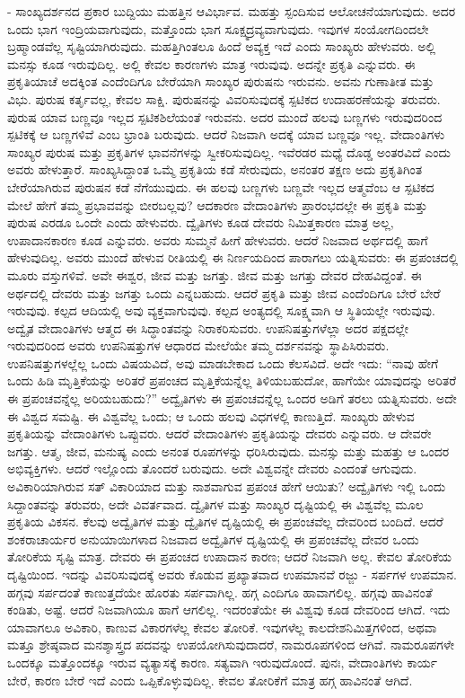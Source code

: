 - ಸಾಂಖ್ಯದರ್ಶನದ ಪ್ರಕಾರ ಬುದ್ದಿಯು ಮಹತ್ತಿನ ಆವಿರ್ಭಾವ. ಮಹತ್ತು ಸ್ಪಂದಿಸುವ ಆಲೋಚನೆಯಾಗುವುದು. ಅದರ ಒಂದು ಭಾಗ ಇಂದ್ರಿಯವಾಗುವುದು, ಮತ್ತೊಂದು ಭಾಗ ಸೂಕ್ಷ್ಮದ್ರವ್ಯವಾಗುವುದು. ಇವುಗಳ ಸಂಯೋಗದಿಂದಲೇ ಬ್ರಹ್ಮಾಂಡವೆಲ್ಲ ಸೃಷ್ಟಿಯಾಗಿರುವುದು. ಮಹತ್ತಿಗಿಂತಲೂ ಹಿಂದೆ ಅವ್ಯಕ್ತ ಇದೆ ಎಂದು ಸಾಂಖ್ಯರು ಹೇಳುವರು. ಅಲ್ಲಿ ಮನಸ್ಸು ಕೂಡ ಇರುವುದಿಲ್ಲ. ಅಲ್ಲಿ ಕೇವಲ ಕಾರಣಗಳು ಮಾತ್ರ ಇರುವುವು. ಅದನ್ನೇ ಪ್ರಕೃತಿ ಎನ್ನುವರು. ಈ ಪ್ರಕೃತಿಯಾಚೆ ಅದಕ್ಕಿಂತ ಎಂದೆಂದಿಗೂ ಬೇರೆಯಾಗಿ ಸಾಂಖ್ಯರ ಪುರುಷನು ಇರುವನು. ಅವನು ಗುಣಾತೀತ ಮತ್ತು ವಿಭು. ಪುರುಷ ಕರ್ತೃವಲ್ಲ, ಕೇವಲ ಸಾಕ್ಷಿ. ಪುರುಷನನ್ನು ವಿವರಿಸುವುದಕ್ಕೆ ಸ್ಪಟಿಕದ ಉದಾಹರಣೆಯನ್ನು ತರುವರು. ಪುರುಷ ಯಾವ ಬಣ್ಣವೂ ಇಲ್ಲದ ಸ್ಪಟಿಕಶಿಲೆಯಂತೆ ಇರುವನು. ಅದರ ಮುಂದೆ ಹಲವು ಬಣ್ಣಗಳು ಇರುವುದರಿಂದ ಸ್ಪಟಿಕಕ್ಕೆ ಆ ಬಣ್ಣಗಳಿವೆ ಎಂಬ ಭ್ರಾಂತಿ ಬರುವುದು. ಆದರೆ ನಿಜವಾಗಿ ಅದಕ್ಕೆ ಯಾವ ಬಣ್ಣವೂ ಇಲ್ಲ. ವೇದಾಂತಿಗಳು ಸಾಂಖ್ಯರ ಪುರುಷ ಮತ್ತು ಪ್ರಕೃತಿಗಳ ಭಾವನೆಗಳನ್ನು ಸ್ವೀಕರಿಸುವುದಿಲ್ಲ. ಇವೆರಡರ ಮಧ್ಯೆ ದೊಡ್ಡ ಅಂತರವಿದೆ ಎಂದು ಅವರು ಹೇಳುತ್ತಾರೆ. ಸಾಂಖ್ಯಸಿದ್ದಾಂತ ಒಮ್ಮೆ ಪ್ರಕೃತಿಯ ಕಡೆ ಸೇರುವುದು, ಅನಂತರ ತಕ್ಷಣ ಅದು ಪ್ರಕೃತಿಗಿಂತ ಬೇರೆಯಾಗಿರುವ ಪುರುಷನ ಕಡೆ ನೆಗೆಯುವುದು. ಈ ಹಲವು ಬಣ್ಣಗಳು ಬಣ್ಣವೇ ಇಲ್ಲದ ಆತ್ಮವೆಂಬ ಆ ಸ್ಪಟಿಕದ ಮೇಲೆ ಹೇಗೆ ತಮ್ಮ ಪ್ರಭಾವವನ್ನು ಬೀರಬಲ್ಲವು? ಆದಕಾರಣ ವೇದಾಂತಿಗಳು ಪ್ರಾರಂಭದಲ್ಲೇ ಈ ಪ್ರಕೃತಿ ಮತ್ತು ಪುರುಷ ಎರಡೂ ಒಂದೇ ಎಂದು ಹೇಳುವರು. ದ್ವೈತಿಗಳು ಕೂಡ ದೇವರು ನಿಮಿತ್ತಕಾರಣ ಮಾತ್ರ ಅಲ್ಲ, ಉಪಾದಾನಕಾರಣ ಕೂಡ ಎನ್ನುವರು. ಅವರು ಸುಮ್ಮನೆ ಹೀಗೆ ಹೇಳುವರು. ಆದರೆ ನಿಜವಾದ ಅರ್ಥದಲ್ಲಿ ಹಾಗೆ ಹೇಳುವುದಿಲ್ಲ. ಅವರು ಮುಂದೆ ಹೇಳುವ ರೀತಿಯಲ್ಲಿ ಈ ನಿರ್ಣಯದಿಂದ ಪಾರಾಗಲು ಯತ್ನಿಸುವರು: ಈ ಪ್ರಪಂಚದಲ್ಲಿ ಮೂರು ವಸ್ತುಗಳಿವೆ. ಅವೇ ಈಶ್ವರ, ಜೀವ ಮತ್ತು ಜಗತ್ತು. ಜೀವ ಮತ್ತು ಜಗತ್ತು ದೇವರ ದೇಹವಿದ್ದಂತೆ. ಈ ಅರ್ಥದಲ್ಲಿ ದೇವರು ಮತ್ತು ಜಗತ್ತು ಒಂದು ಎನ್ನಬಹುದು. ಆದರೆ ಪ್ರಕೃತಿ ಮತ್ತು ಜೀವ ಎಂದೆಂದಿಗೂ ಬೇರೆ ಬೇರೆ ಇರುವುವು. ಕಲ್ಪದ ಆದಿಯಲ್ಲಿ ಅವು ವ್ಯಕ್ತವಾಗುವುವು. ಕಲ್ಪದ ಅಂತ್ಯದಲ್ಲಿ ಸೂಕ್ಷ್ಮವಾಗಿ ಆ ಸ್ಥಿತಿಯಲ್ಲೇ ಇರುವುವು. ಅದ್ವೈತ ವೇದಾಂತಿಗಳು ಆತ್ಮದ ಈ ಸಿದ್ಧಾಂತವನ್ನು ನಿರಾಕರಿಸುವರು. ಉಪನಿಷತ್ತುಗಳೆಲ್ಲಾ ಅದರ ಪಕ್ಷದಲ್ಲೇ ಇರುವುದರಿಂದ ಅವರು ಉಪನಿಷತ್ತುಗಳ ಆಧಾರದ ಮೇಲೆಯೇ ತಮ್ಮ ದರ್ಶನವನ್ನು ಸ್ಥಾಪಿಸಿರುವರು. ಉಪನಿಷತ್ತುಗಳಲ್ಲೆಲ್ಲ ಒಂದು ವಿಷಯವಿದೆ, ಅವು ಮಾಡಬೇಕಾದ ಒಂದು ಕೆಲಸವಿದೆ. ಅದೇ ಇದು: “ನಾವು ಹೇಗೆ ಒಂದು ಹಿಡಿ ಮೃತ್ತಿಕೆಯನ್ನು ಅರಿತರೆ ಪ್ರಪಂಚದ ಮೃತ್ತಿಕೆಯನ್ನೆಲ್ಲ ತಿಳಿಯಬಹುದೋ, ಹಾಗೆಯೇ ಯಾವುದನ್ನು ಅರಿತರೆ ಈ ಪ್ರಪಂಚವನ್ನೆಲ್ಲ ಅರಿಯಬಹುದು?” ಅದ್ವೈತಿಗಳು ಈ ಪ್ರಪಂಚವನ್ನೆಲ್ಲ ಒಂದರ ಅಡಿಗೆ ತರಲು ಯತ್ನಿಸುವರು. ಅದೇ ಈ ವಿಶ್ವದ ಸಮಷ್ಟಿ. ಈ ವಿಶ್ವವೆಲ್ಲ ಒಂದು; ಆ ಒಂದು ಹಲವು ವಿಧಗಳಲ್ಲಿ ಕಾಣುತ್ತಿದೆ. ಸಾಂಖ್ಯರು ಹೇಳುವ ಪ್ರಕೃತಿಯನ್ನು ವೇದಾಂತಿಗಳು ಒಪ್ಪುವರು. ಆದರೆ ವೇದಾಂತಿಗಳು ಪ್ರಕೃತಿಯನ್ನು ದೇವರು ಎನ್ನುವರು. ಆ ದೇವರೇ ಜಗತ್ತು. ಆತ್ಮ, ಜೀವ, ಮನುಷ್ಯ ಎಂದು ಅನಂತ ರೂಪಗಳನ್ನು ಧರಿಸಿರುವುದು. ಮನಸ್ಸು ಮತ್ತು ಮಹತ್ತು ಆ ಒಂದರ ಅಭಿವ್ಯಕ್ತಿಗಳು. ಆದರೆ ಇಲ್ಲೊಂದು ತೊಂದರೆ ಬರುವುದು. ಅದೇ ವಿಶ್ವವನ್ನೇ ದೇವರು ಎಂದಂತೆ ಆಗುವುದು. ಅವಿಕಾರಿಯಾಗಿರುವ ಸತ್ ವಿಕಾರಿಯಾದ ಮತ್ತು ನಾಶವಾಗುವ ಪ್ರಪಂಚ ಹೇಗೆ ಆಯಿತು? ಅದ್ವೈತಿಗಳು ಇಲ್ಲಿ ಒಂದು ಸಿದ್ದಾಂತವನ್ನು ತರುವರು, ಅದೇ ವಿವರ್ತವಾದ. ದ್ವೈತಿಗಳ ಮತ್ತು ಸಾಂಖ್ಯರ ದೃಷ್ಟಿಯಲ್ಲಿ ಈ ವಿಶ್ವವೆಲ್ಲ ಮೂಲ ಪ್ರಕೃತಿಯ ವಿಕಸನ. ಕೆಲವು ಅದ್ವೈತಿಗಳ ಮತ್ತು ದ್ವೈತಿಗಳ ದೃಷ್ಟಿಯಲ್ಲಿ ಈ ಪ್ರಪಂಚವೆಲ್ಲ ದೇವರಿಂದ ಬಂದಿದೆ. ಆದರೆ ಶಂಕರಾಚಾರ್ಯರ ಅನುಯಾಯಿಗಳಾದ ನಿಜವಾದ ಅದ್ವೈತಿಗಳ ದೃಷ್ಟಿಯಲ್ಲಿ ಈ ಪ್ರಪಂಚವೆಲ್ಲ ದೇವರ ಒಂದು ತೋರಿಕೆಯ ಸೃಷ್ಟಿ ಮಾತ್ರ. ದೇವರು ಈ ಪ್ರಪಂಚದ ಉಪಾದಾನ ಕಾರಣ; ಆದರೆ ನಿಜವಾಗಿ ಅಲ್ಲ. ಕೇವಲ ತೋರಿಕೆಯ ದೃಷ್ಟಿಯಿಂದ. ಇದನ್ನು ವಿವರಿಸುವುದಕ್ಕೆ ಅವರು ಕೊಡುವ ಪ್ರಖ್ಯಾತವಾದ ಉಪಮಾನವೆ ರಜ್ಜು - ಸರ್ಪಗಳ ಉಪಮಾನ. ಹಗ್ಗವು ಸರ್ಪದಂತೆ ಕಾಣುತ್ತದೆಯೇ ಹೊರತು ಸರ್ಪವಾಗಿಲ್ಲ. ಹಗ್ಗ ಎಂದಿಗೂ ಹಾವಾಗಲಿಲ್ಲ. ಹಗ್ಗವು ಹಾವಿನಂತೆ ಕಂಡಿತು, ಅಷ್ಟೆ. ಆದರೆ ನಿಜವಾಗಿಯೂ ಹಾಗೆ ಆಗಲಿಲ್ಲ. ಇದರಂತೆಯೇ ಈ ವಿಶ್ವವು ಕೂಡ ದೇವರಿಂದ ಆಗಿದೆ. ಇದು ಯಾವಾಗಲೂ ಅವಿಕಾರಿ, ಕಾಣುವ ವಿಕಾರಗಳೆಲ್ಲ ಕೇವಲ ತೋರಿಕೆ. ಇವುಗಳೆಲ್ಲ ಕಾಲದೇಶನಿಮಿತ್ತಗಳಿಂದ, ಅಥವಾ ಮತ್ತೂ ಶ್ರೇಷ್ಠವಾದ ಮನಶ್ಶಾಸ್ತ್ರದ ಪದವನ್ನು ಉಪಯೋಗಿಸುವುದಾದರೆ, ನಾಮರೂಪಗಳಿಂದ ಆಗಿವೆ. ನಾಮರೂಪಗಳೇ ಒಂದಕ್ಕೂ ಮತ್ತೊಂದಕ್ಕೂ ಇರುವ ವ್ಯತ್ಯಾಸಕ್ಕೆ ಕಾರಣ. ಸತ್ಯವಾಗಿ ಇರುವುದೊಂದೆ. ಪುನಃ, ವೇದಾಂತಿಗಳು ಕಾರ್ಯ ಬೇರೆ, ಕಾರಣ ಬೇರೆ ಇದೆ ಎಂದು ಒಪ್ಪಿಕೊಳ್ಳುವುದಿಲ್ಲ. ಕೇವಲ ತೋರಿಕೆಗೆ ಮಾತ್ರ ಹಗ್ಗ ಹಾವಿನಂತೆ ಆಗಿದೆ. 